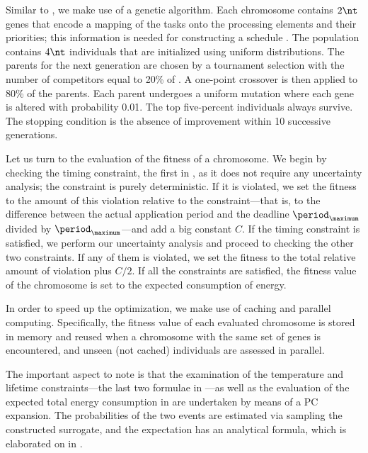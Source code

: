 Similar to , we make use of a genetic algorithm.
Each chromosome contains $2 \nt$ genes that encode a mapping of the tasks onto
the processing elements and their priorities; this information is needed for
constructing a schedule \schedule. The population contains $4 \nt$ individuals
that are initialized using uniform distributions. The parents for the next
generation are chosen by a tournament selection with the number of competitors
equal to 20\% of \nt. A one-point crossover is then applied to 80\% of the
parents. Each parent undergoes a uniform mutation where each gene is altered
with probability 0.01. The top five-percent individuals always survive. The
stopping condition is the absence of improvement within 10 successive
generations.

Let us turn to the evaluation of the fitness of a chromosome. We begin by
checking the timing constraint, the first in
, as it does not require any uncertainty
analysis; the constraint is purely deterministic. If it is violated, we set the
fitness to the amount of this violation relative to the constraint---that is, to
the difference between the actual application period and the deadline
$\period_\maximum$ divided by $\period_\maximum$---and add a big constant $C$.
If the timing constraint is satisfied, we perform our uncertainty analysis and
proceed to checking the other two constraints. If any of them is violated, we
set the fitness to the total relative amount of violation plus $C / 2$. If all
the constraints are satisfied, the fitness value of the chromosome is set to the
expected consumption of energy.

In order to speed up the optimization, we make use of caching and parallel
computing. Specifically, the fitness value of each evaluated chromosome is
stored in memory and reused when a chromosome with the same set of genes is
encountered, and unseen (not cached) individuals are assessed in parallel.

The important aspect to note is that the examination of the temperature and
lifetime constraints---the last two formulae in
---as well as the evaluation of the
expected total energy consumption in  are
undertaken by means of a \ac{PC} expansion. The probabilities of the two events
are estimated via sampling the constructed surrogate, and the expectation has an
analytical formula, which is elaborated on in .
